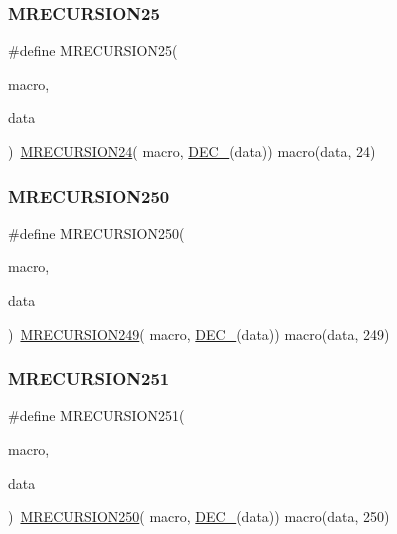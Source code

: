 \subsubsection{\texorpdfstring{MRECURSION25}{MRECURSION25}}
{\footnotesize\ttfamily \#define M\+R\+E\+C\+U\+R\+S\+I\+O\+N25(\begin{DoxyParamCaption}\item[{}]{macro,  }\item[{}]{data }\end{DoxyParamCaption})~\mbox{\hyperlink{group__group__sam0__utils__mrecursion_ga18b9e365b9471938a0a0dbe70d1edfff}{M\+R\+E\+C\+U\+R\+S\+I\+O\+N24}}(  macro, \mbox{\hyperlink{group__group__sam0__utils__mrecursion_ga1d23d683797679dca8c3512a54a5dcae}{D\+E\+C\+\_\+}}(data))   macro(data, 24)}

\mbox{\label{group__group__sam0__utils__mrecursion_gabf6d964d9a876f23c5d7269c10bb4d08}} 
\subsubsection{\texorpdfstring{MRECURSION250}{MRECURSION250}}
{\footnotesize\ttfamily \#define M\+R\+E\+C\+U\+R\+S\+I\+O\+N250(\begin{DoxyParamCaption}\item[{}]{macro,  }\item[{}]{data }\end{DoxyParamCaption})~\mbox{\hyperlink{group__group__sam0__utils__mrecursion_ga88378c5ef3f59f0a70241fe6f4c35673}{M\+R\+E\+C\+U\+R\+S\+I\+O\+N249}}(  macro, \mbox{\hyperlink{group__group__sam0__utils__mrecursion_ga1d23d683797679dca8c3512a54a5dcae}{D\+E\+C\+\_\+}}(data))   macro(data, 249)}

\mbox{\label{group__group__sam0__utils__mrecursion_ga41dbf786afa14bfc12394ead27564bea}} 
\subsubsection{\texorpdfstring{MRECURSION251}{MRECURSION251}}
{\footnotesize\ttfamily \#define M\+R\+E\+C\+U\+R\+S\+I\+O\+N251(\begin{DoxyParamCaption}\item[{}]{macro,  }\item[{}]{data }\end{DoxyParamCaption})~\mbox{\hyperlink{group__group__sam0__utils__mrecursion_gabf6d964d9a876f23c5d7269c10bb4d08}{M\+R\+E\+C\+U\+R\+S\+I\+O\+N250}}(  macro, \mbox{\hyperlink{group__group__sam0__utils__mrecursion_ga1d23d683797679dca8c3512a54a5dcae}{D\+E\+C\+\_\+}}(data))   macro(data, 250)}

